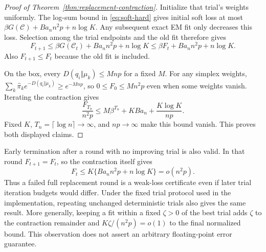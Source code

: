 \begin{proof}[Proof of Theorem~\ref{thm:replacement-contraction}]
Initialize that trial's weights uniformly. The log-sum bound in \eqref{eq:soft-hard} gives initial soft loss at most $\beta G(\mathcal C)+Ba_n n^2p+n\log K$. Any subsequent exact EM fit only decreases this loss. Selection among the trial endpoints and the old fit therefore gives
\[
 F_{t+1}\le\beta G(\mathcal C_t)+Ba_n n^2p+n\log K
          \le\beta F_t+Ba_n n^2p+n\log K.
\]
Also $F_{t+1}\le F_t$ because the old fit is included.

On the box, every $D(q_i\Vert\mu_k)\le Mnp$ for a fixed $M$. For any simplex weights,
$\sum_k\widehat\pi_ke^{-D(q_i\Vert\mu_k)}\ge e^{-Mnp}$,
so $0\le F_0\le Mn^2p$ even when some weights vanish. Iterating the contraction gives
\[
 \frac{F_{T_n}}{n^2p}
 \le M\beta^{T_n}+KB a_n+\frac{K\log K}{np}.
\]
Fixed $K$, $T_n=\lceil\log n\rceil\to\infty$, and $np\to\infty$ make this bound vanish. This proves both displayed claims.
\end{proof}

Early termination after a round with no improving trial is also valid. In that round $F_{t+1}=F_t$, so the contraction itself gives
\[
 F_t\le K\{Ba_n n^2p+n\log K\}=o(n^2p).
\]
Thus a failed full replacement round is a weak-loss certificate even if later trial iteration budgets would differ. Under the fixed trial protocol used in the implementation, repeating unchanged deterministic trials also gives the same result. More generally, keeping a fit within a fixed $\zeta>0$ of the best trial adds $\zeta$ to the contraction remainder and $K\zeta/(n^2p)=o(1)$ to the final normalized bound. This observation does not assert an arbitrary floating-point error guarantee.

